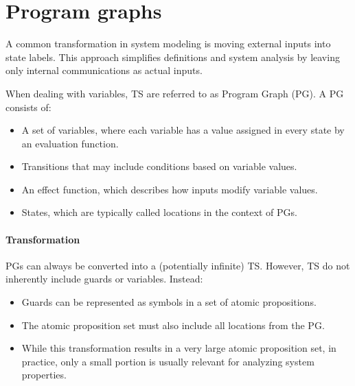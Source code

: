 \section{Program graphs}

A common transformation in system modeling is moving external inputs into state labels. 
This approach simplifies definitions and system analysis by leaving only internal communications as actual inputs.

When dealing with variables, TS are referred to as Program Graph (PG). 
A PG consists of:
\begin{itemize}
    \item A set of variables, where each variable has a value assigned in every state by an evaluation function.
    \item Transitions that may include conditions based on variable values.
    \item An effect function, which describes how inputs modify variable values.
    \item States, which are typically called locations in the context of PGs.
\end{itemize}

\paragraph*{Transformation}
PGs can always be converted into a (potentially infinite) TS.
However, TS do not inherently include guards or variables. 
Instead:
\begin{itemize}
    \item Guards can be represented as symbols in a set of atomic propositions.
    \item The atomic proposition set must also include all locations from the PG.
    \item While this transformation results in a very large atomic proposition set, in practice, only a small portion is usually relevant for analyzing system properties.
\end{itemize}